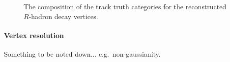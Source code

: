 \begin{figure}[tbp]
\begin{center}
\caption{The composition of the track truth categories for the reconstructed $R$-hadron decay vertices.}
\label{fig:Rhadron_trackType}
\end{center}
\end{figure}

\paragraph{Vertex resolution}
Something to be noted down... e.g.~non-gaussianity.


